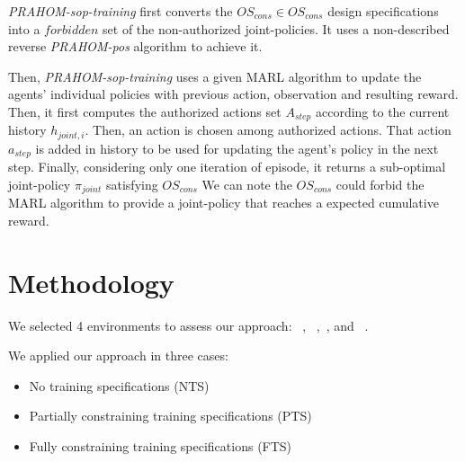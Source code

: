 \documentclass{ecai}
\begin{document}
\emph{PRAHOM-sop-training} first converts the $OS_{cons} \in OS_{cons}$ design specifications into a $forbidden$ set of the non-authorized joint-policies. It uses a non-described reverse \emph{PRAHOM-pos} algorithm to achieve it.

Then, \emph{PRAHOM-sop-training} uses a given MARL algorithm to update the agents' individual policies with previous action, observation and resulting reward. Then, it first computes the authorized actions set $A_{step}$ according to the current history $h_{joint,i}$. Then, an action is chosen among authorized actions. That action $a_{step}$ is added in history to be used for updating the agent's policy in the next step.
Finally, considering only one iteration of episode, it returns a sub-optimal joint-policy $\pi_{joint}$ satisfying $OS_{cons}$
We can note the $OS_{cons}$ could forbid the MARL algorithm to provide a joint-policy that reaches a expected cumulative reward.


\section{Methodology}


We selected 4 environments to assess our approach: ~\citep{Lowe2017},
~\citep{Kurach2020},~\citep{Terry2021}, and ~\citep{Terry2021}.


We applied our approach in three cases:
\begin{itemize}
    \item No training specifications (NTS)
    \item Partially constraining training specifications (PTS)
    \item Fully constraining training specifications (FTS)
\end{itemize}
\end{document}
